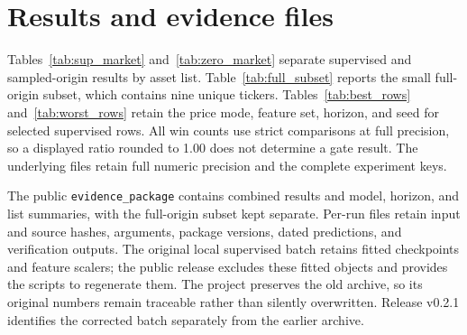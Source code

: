 \section{Results and evidence files}

Tables~\ref{tab:sup_market} and~\ref{tab:zero_market} separate supervised and sampled-origin results by asset list. Table~\ref{tab:full_subset} reports the small full-origin subset, which contains nine unique tickers. Tables~\ref{tab:best_rows} and~\ref{tab:worst_rows} retain the price mode, feature set, horizon, and seed for selected supervised rows. All win counts use strict comparisons at full precision, so a displayed ratio rounded to 1.00 does not determine a gate result. The underlying files retain full numeric precision and the complete experiment keys.


\FloatBarrier

The public \texttt{evidence\_package} contains combined results and model, horizon, and list summaries, with the full-origin subset kept separate. Per-run files retain input and source hashes, arguments, package versions, dated predictions, and verification outputs. The original local supervised batch retains fitted checkpoints and feature scalers; the public release excludes these fitted objects and provides the scripts to regenerate them. The project preserves the old archive, so its original numbers remain traceable rather than silently overwritten. Release v0.2.1 identifies the corrected batch separately from the earlier archive.
